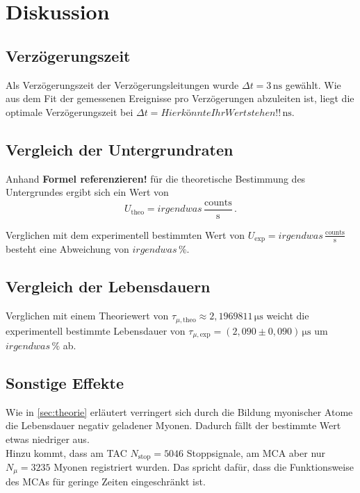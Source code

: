 \section{Diskussion}
\label{sec:Diskussion}

\subsection{Verzögerungszeit}

Als Verzögerungszeit der Verzögerungsleitungen wurde $\Delta t = 3 \,\unit{\nano\second}$ gewählt.
Wie aus dem Fit der gemessenen Ereignisse pro Verzögerungen abzuleiten ist, liegt die optimale Verzögerungszeit bei
$\Delta t = Hier könnte Ihr Wert stehen!! \,\unit{\nano\second}$.


\subsection{Vergleich der Untergrundraten}

Anhand \textbf{Formel referenzieren!} für die theoretische Bestimmung des Untergrundes ergibt sich ein Wert von
\begin{equation}
    U_\text{theo} = irgendwas \,\frac{\text{counts}}{\unit{\second}} \,.
\end{equation}

Verglichen mit dem experimentell bestimmten Wert von $U_\text{exp} = irgendwas \,\frac{\text{counts}}{\unit{\second}}$ besteht eine Abweichung von
$irgendwas \,\%$.

\subsection{Vergleich der Lebensdauern}

Verglichen mit einem Theoriewert von $\tau_{\mu,\text{theo}} \approx 2,196 981 1 \,\unit{\micro\second}$ \cite{pdg} weicht die experimentell bestimmte Lebensdauer von
$\tau_{\mu,\text{exp}} =  \left(2,090  \pm 0,090 \right) \,\unit{\micro\second}$ um $irgendwas \,\%$ ab.


\subsection{Sonstige Effekte}

Wie in \autoref{sec:theorie} erläutert verringert sich durch die Bildung myonischer Atome die Lebensdauer
negativ geladener Myonen. Dadurch fällt der bestimmte Wert etwas niedriger aus. \\

Hinzu kommt, dass am TAC $N_\text{stop} = 5046$ Stoppsignale, am MCA aber nur $N_{\mu} = 3235$ Myonen registriert wurden. Das spricht dafür,
dass die Funktionsweise des MCAs für geringe Zeiten eingeschränkt ist.
